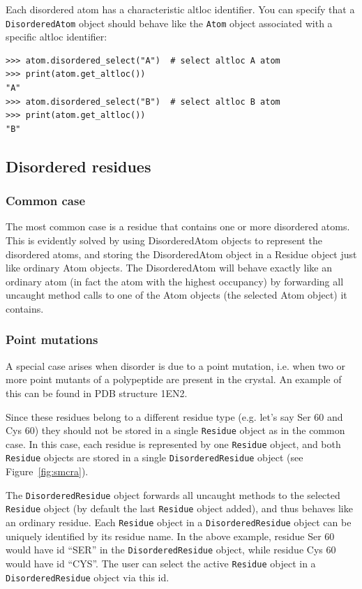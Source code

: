 Each disordered atom has a characteristic altloc identifier. You can
specify that a \texttt{Disordered\-Atom} object should behave like
the \texttt{Atom} object associated with a specific altloc identifier:

\begin{verbatim}
>>> atom.disordered_select("A")  # select altloc A atom
>>> print(atom.get_altloc())
"A"
>>> atom.disordered_select("B")  # select altloc B atom
>>> print(atom.get_altloc())
"B"
\end{verbatim}

\subsection{Disordered residues}

\subsubsection*{Common case}

The most common case is a residue that contains one or more disordered atoms.
This is evidently solved by using DisorderedAtom objects to represent the disordered
atoms, and storing the DisorderedAtom object in a Residue object just like ordinary
Atom objects. The DisorderedAtom will behave exactly like an ordinary atom (in
fact the atom with the highest occupancy) by forwarding all uncaught method
calls to one of the Atom objects (the selected Atom object) it contains.

\subsubsection*{Point mutations}
\label{sec:point_mutations}

A special case arises when disorder is due to a point mutation, i.e. when two
or more point mutants of a polypeptide are present in the crystal. An example
of this can be found in PDB structure 1EN2.

Since these residues belong to a different residue type (e.g. let's
say Ser 60 and Cys 60) they should not be stored in a single \texttt{Residue}
object as in the common case. In this case, each residue is represented
by one \texttt{Residue} object, and both \texttt{Residue} objects
are stored in a single \texttt{Disordered\-Residue} object (see
Figure~\ref{fig:smcra}).

The \texttt{Dis\-ordered\-Residue} object forwards all un\-caught methods to
the selected \texttt{Residue} object (by default the last \texttt{Residue}
object added), and thus behaves like an ordinary residue. Each
\texttt{Residue} object in a \texttt{Disordered\-Residue} object can be
uniquely identified by its residue name. In the above example, residue Ser 60
would have id ``SER'' in the \texttt{Disordered\-Residue} object, while
residue Cys 60 would have id ``CYS''. The user can select the active
\texttt{Residue} object in a \texttt{Disordered\-Residue} object via this id.

